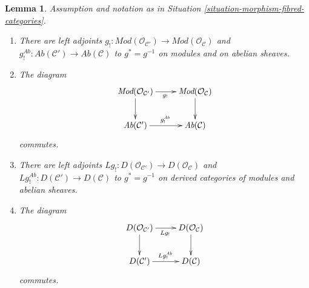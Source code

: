 \documentclass[10pt,a4paper]{amsart}
\theoremstyle{plain}
\newtheorem{lemma}[subsection]{Lemma}
\theoremstyle{definition}
\theoremstyle{remark}
\numberwithin{equation}{subsection}
\begin{document}
\begin{lemma}
\label{lemma-properties-lower-shriek-fibred-category}
Assumption and notation as in
Situation \ref{situation-morphism-fibred-categories}.
\begin{enumerate}
\item There are left adjoints
$g_! : \textit{Mod}(\mathcal{O}_{\mathcal{C}'}) \to
\textit{Mod}(\mathcal{O}_\mathcal{C})$ and
$g_!^{\textit{Ab}} : \textit{Ab}(\mathcal{C}') \to \textit{Ab}(\mathcal{C})$
to $g^* = g^{-1}$ on modules and on abelian sheaves.
\item The diagram
$$
\xymatrix{
\textit{Mod}(\mathcal{O}_{\mathcal{C}'}) \ar[d] \ar[r]_{g_!} &
\textit{Mod}(\mathcal{O}_\mathcal{C}) \ar[d] \\
\textit{Ab}(\mathcal{C}') \ar[r]^{g_!^{\textit{Ab}}} &
\textit{Ab}(\mathcal{C})
}
$$
commutes.
\item There are left adjoints
$Lg_! : D(\mathcal{O}_{\mathcal{C}'}) \to D(\mathcal{O}_\mathcal{C})$
and
$Lg_!^{\textit{Ab}} : D(\mathcal{C}') \to D(\mathcal{C})$
to $g^* = g^{-1}$ on derived categories of modules and abelian sheaves.
\item The diagram
$$
\xymatrix{
D(\mathcal{O}_{\mathcal{C}'}) \ar[d] \ar[r]_{Lg_!} &
D(\mathcal{O}_\mathcal{C}) \ar[d] \\
D(\mathcal{C}') \ar[r]^{Lg_!^{\textit{Ab}}} &
D(\mathcal{C})
}
$$
commutes.
\end{enumerate}
\end{lemma}
\end{document}
